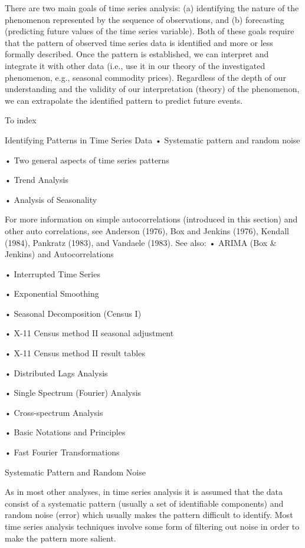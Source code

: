 There are two main goals of time series analysis: (a) identifying the nature of the phenomenon represented by the sequence of observations, and (b) forecasting (predicting future values of the time series variable). Both of these goals require that the pattern of observed time series data is identified and more or less formally described. Once the pattern is established, we can interpret and integrate it with other data (i.e., use it in our theory of the investigated phenomenon, e.g., seasonal commodity prices). Regardless of the depth of our understanding and the validity of our interpretation (theory) of the phenomenon, we can extrapolate the identified pattern to predict future events.







To index
 

 

Identifying Patterns in Time Series Data
•
Systematic pattern and random noise

•
Two general aspects of time series patterns

•
Trend Analysis

•
Analysis of Seasonality


For more information on simple autocorrelations (introduced in this section) and other auto correlations, see Anderson (1976), Box and Jenkins (1976), Kendall (1984), Pankratz (1983), and Vandaele (1983). See also:
•
ARIMA (Box & Jenkins) and Autocorrelations

•
Interrupted Time Series

•
Exponential Smoothing

•
Seasonal Decomposition (Census I)

•
X-11 Census method II seasonal adjustment

•
X-11 Census method II result tables

•
Distributed Lags Analysis

•
Single Spectrum (Fourier) Analysis

•
Cross-spectrum Analysis

•
Basic Notations and Principles

•
Fast Fourier Transformations


Systematic Pattern and Random Noise

As in most other analyses, in time series analysis it is assumed that the data consist of a systematic pattern (usually a set of identifiable components) and random noise (error) which usually makes the pattern difficult to identify. Most time series analysis techniques involve some form of filtering out noise in order to make the pattern more salient.

